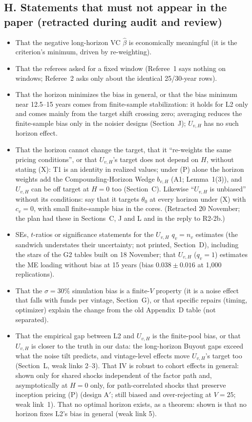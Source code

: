 \documentclass[11pt]{article}
\begin{document}
\subsection*{H. Statements that must not appear in the paper (retracted during audit and review)}
\begin{itemize}
\item That the negative long-horizon VC $\hat\beta$ is economically meaningful (it is the criterion's minimum, driven by re-weighting).
\item That the referees asked for a fixed window (Referee~1 says nothing on windows; Referee~2 asks only about the identical 25/30-year rows).
\item That the horizon minimizes the bias in general, or that the bias minimum near 12.5--15 years comes from finite-sample stabilization: it holds for L2 only and comes mainly from the target shift crossing zero; averaging reduces the finite-sample bias only in the noisier designs (Section~J); $U_{v,H}$ has no such horizon effect.
\item That the horizon cannot change the target, that it ``re-weights the same pricing conditions'', or that $U_{v,H}$'s target does not depend on $H$, without stating (X): T1 is an identity in realized values; under (P) alone the horizon weights add the Compounding-Horizon Wedge $b_{v,H}$ (A1; Lemma~1(3)), and $U_{v,H}$ can be off target at $H=0$ too (Section~C). Likewise ``$U_{v,H}$ is unbiased'' without its conditions: say that it targets $\theta_0$ at every horizon under (X) with $c_v=0$, with small finite-sample bias in the cores. (Retracted 20 November; the plan had these in Sections~C, J and L and in the reply to R2-2b.)
\item SEs, $t$-ratios or significance statements for the $U_{v,H}$ $q_v=n_v$ estimates (the sandwich understates their uncertainty; not printed, Section~D), including the stars of the G2 tables built on 18 November; that $U_{v,H}$ ($q_v=1$) estimates the ME loading without bias at 15 years (bias $0.038\pm0.016$ at 1{,}000 replications).
\item That the $\sigma=30\%$ simulation bias is a finite-$V$ property (it is a noise effect that falls with funds per vintage, Section~G), or that specific repairs (timing, optimizer) explain the change from the old Appendix~D table (not separated).
\item That the empirical gap between L2 and $U_{v,H}$ is the finite-pool bias, or that $U_{v,H}$ is closer to the truth in our data: the long-horizon Buyout gaps exceed what the noise tilt predicts, and vintage-level effects move $U_{v,H}$'s target too (Section~L, weak links 2--3). That IV is robust to cohort effects in general: shown only for shared shocks independent of the factor path and, asymptotically at $H=0$ only, for path-correlated shocks that preserve inception pricing (P) (design A$'$; still biased and over-rejecting at $V=25$; weak link~1). That no optimal horizon exists, as a theorem: shown is that no horizon fixes L2's bias in general (weak link 5).

\end{itemize}
\end{document}
